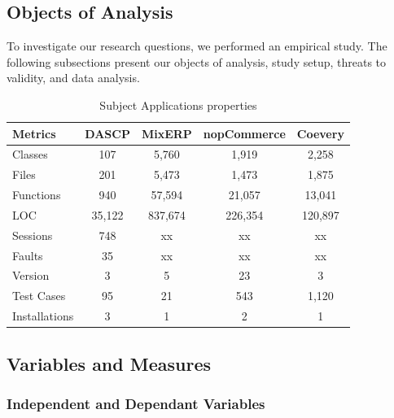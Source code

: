 \subsection{Objects of Analysis}
\label{sec:objects}

To investigate our research questions, we performed
an empirical study.
The following subsections present our objects of analysis, 
study setup, threats to validity, and data analysis.

%
\begin{table}
	\caption{Subject Applications properties}
	\begin{center}
		\begin{tabular}{|l||c||c||c||c|}
			\hline
			Metrics  & DASCP & MixERP & nopCommerce & Coevery \\\hline
			Classes   & 107  & 5,760 & 1,919& 2,258 \\\hline
			Files  & 201  & 5,473 & 1,473 & 1,875 \\\hline
			Functions & 940  & 57,594 & 21,057 & 13,041 \\\hline
			LOC &   35,122  & 837,674  & 226,354 &120,897 \\\hline
			Sessions  & 748 &  xx&xx &xx\\\hline
			Faults  & 35 &  xx& xx&xx\\\hline
			Version  & 3 &  5 & 23 & 3 \\\hline
			Test Cases & 95& 21 & 543 & 1,120\\\hline
			Installations & 3 & 1  & 2 & 1 \\\hline
		\end{tabular}
		\end {center}
		\label{tab:AUTs}
	\end{table}


\subsection{Variables and Measures}
\label{sec:measures}

\subsubsection{Independent and Dependant Variables}
\label{sec:independent}


